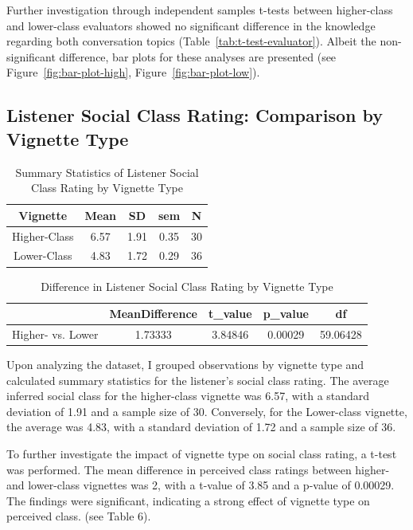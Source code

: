 \documentclass[
  man,floatsintext]{apa6}
\begin{document}
Further investigation through independent samples t-tests between higher-class and lower-class evaluators showed no significant difference in the knowledge regarding both conversation topics (Table~\ref{tab:t-test-evaluator}). Albeit the non-significant difference, bar plots for these analyses are presented (see Figure~\ref{fig:bar-plot-high}, Figure~\ref{fig:bar-plot-low}).

\hypertarget{listener-social-class-rating-comparison-by-vignette-type}{%
\subsection{Listener Social Class Rating: Comparison by Vignette Type}\label{listener-social-class-rating-comparison-by-vignette-type}}

\begin{table}[!h]
\centering
\caption{\label{tab:t-test-stat}Summary Statistics of Listener Social Class Rating by Vignette Type}
\centering
\begin{tabular}[t]{ccccc}
\toprule
Vignette & Mean & SD & sem & N\\
\midrule
Higher-Class & 6.57 & 1.91 & 0.35 & 30\\
Lower-Class & 4.83 & 1.72 & 0.29 & 36\\
\bottomrule
\end{tabular}
\end{table}

\begin{table}[!h]
\centering
\caption{\label{tab:t-test-listener}Difference in Listener Social Class Rating by Vignette Type}
\centering
\begin{tabular}[t]{lcccc}
\toprule
  & MeanDifference & t\_value & p\_value & df\\
\midrule
Higher- vs. Lower & 1.73333 & 3.84846 & 0.00029 & 59.06428\\
\bottomrule
\end{tabular}
\end{table}

Upon analyzing the dataset, I grouped observations by vignette type and calculated summary statistics for the listener's social class rating. The average inferred social class for the higher-class vignette was 6.57, with a standard deviation of 1.91 and a sample size of 30. Conversely, for the Lower-class vignette, the average was 4.83, with a standard deviation of 1.72 and a sample size of 36.

To further investigate the impact of vignette type on social class rating, a t-test was performed. The mean difference in perceived class ratings between higher- and lower-class vignettes was 2, with a t-value of 3.85 and a p-value of 0.00029. The findings were significant, indicating a strong effect of vignette type on perceived class. (see Table 6).
\end{document}
